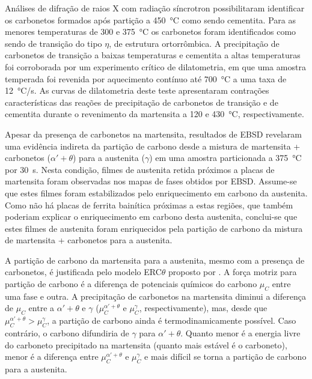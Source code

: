 Análises de difração de raios X com radiação síncrotron possibilitaram identificar os carbonetos formados após partição a \SI{450}{\degreeCelsius} como sendo cementita. Para as menores temperaturas de 300 e \SI{375}{\degreeCelsius} os carbonetos foram identificados como sendo de transição do tipo $\eta$, de estrutura ortorrômbica. A precipitação de carbonetos de transição a baixas temperaturas e cementita a altas temperaturas foi corroborada por um experimento crítico de dilatometria, em que uma amostra temperada foi revenida por aquecimento contínuo até \SI{700}{\degreeCelsius} a uma taxa de \SI{12}{\degreeCelsius/s}. As curvas de dilatometria deste teste apresentaram contrações características das reações de precipitação de carbonetos de transição e de cementita durante o revenimento da martensita a 120 e \SI{430}{\degreeCelsius}, respectivamente.

Apesar da presença de carbonetos na martensita, resultados de EBSD revelaram uma evidência indireta da partição de carbono desde a mistura de martensita + carbonetos ($\alpha' + \theta$) para a austenita ($\gamma$) em uma amostra particionada a \SI{375}{\degreeCelsius} por 30~s. Nesta condição, filmes de austenita retida próximos a placas de martensita foram observadas nos mapas de fases obtidos por EBSD. Assume-se que estes filmes foram estabilizados pelo enriquecimento em carbono da austenita. Como não há placas de ferrita bainítica próximas a estas regiões, que também poderiam explicar o enriquecimento em carbono desta austenita, conclui-se que estes filmes de austenita foram enriquecidos pela partição de carbono da mistura de martensita + carbonetos para a austenita.

A partição de carbono da martensita para a austenita, mesmo com a presença de carbonetos, é justificada pelo modelo ERC$\theta$ proposto por . A força motriz para partição de carbono é a diferença de potenciais químicos do carbono $\mu_C$ entre uma fase e outra. A precipitação de carbonetos na martensita diminui a diferença de $\mu_C$ entre a $\alpha' + \theta$ e $\gamma$ ($\mu_C^{\alpha' + \theta}$ e $\mu_C^\gamma$, respectivamente), mas, desde que $\mu_C^{\alpha' + \theta} > \mu_C^\gamma$, a partição de carbono ainda é termodinamicamente possível. Caso contrário, o carbono difundiria de $\gamma$ para $\alpha' + \theta$. Quanto menor é a energia livre do carboneto precipitado na martensita (quanto mais estável é o carboneto), menor é a diferença entre $\mu_C^{\alpha' + \theta}$ e $\mu_C^\gamma$ e mais difícil se torna a partição de carbono para a austenita. 

